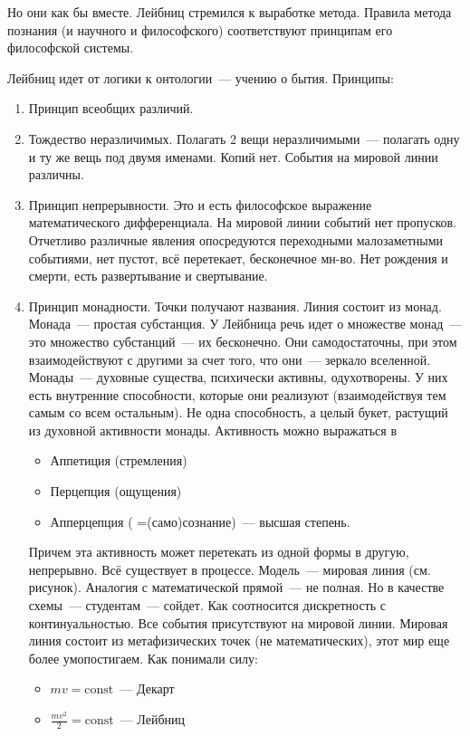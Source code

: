 Но они как бы вместе. Лейбниц стремился к выработке метода. Правила метода познания (и научного и философского) соответствуют принципам его философской системы.

Лейбниц идет от логики к онтологии~--- учению о бытия. Принципы:
\begin{enumerate}
	\item Принцип всеобщих различий. 
	\item Тождество неразличимых. Полагать 2 вещи неразличимыми~--- полагать одну и ту же вещь под двумя именами. Копий нет. События на мировой линии различны. 
	\item Принцип непрерывности. Это и есть философское выражение математического дифференциала. На мировой линии событий нет пропусков. Отчетливо различные явления опосредуются переходными малозаметными событиями, нет пустот, всё перетекает, бесконечное мн-во. Нет рождения и смерти, есть развертывание и свертывание. 
	\item Принцип монадности. Точки получают названия. Линия состоит из монад. Монада~--- простая субстанция. У Лейбница речь идет о множестве монад~--- это множество субстанций~--- их бесконечно. Они самодостаточны, при этом взаимодействуют с другими за счет того, что они~--- зеркало вселенной. Монады~--- духовные существа, психически активны, одухотворены. У них есть внутренние способности, которые они реализуют (взаимодействуя тем самым со всем остальным). Не одна способность, а целый букет, растущий из духовной активности монады. Активность можно выражаться в 
	\begin{itemize}
		\item Аппетиция (стремления)
		\item Перцепция (ощущения)
		\item Апперцепция ( =(само)сознание)~--- высшая степень.
	\end{itemize}
	Причем эта активность может перетекать из одной формы в другую, непрерывно. 
	Всё существует в процессе. 
	Модель~--- мировая линия (см. рисунок). Аналогия с математической прямой~--- не полная. Но в качестве схемы~--- студентам~--- сойдет. Как соотносится дискретность с континуальностью. Все события присутствуют на мировой линии. Мировая линия состоит из метафизических точек (не математических), этот мир еще более умопостигаем.
	Как понимали силу:
	\begin{itemize}
		\item $mv=\text{const}$~--- Декарт
		\item $\frac{mv^2}2=\text{const}$~--- Лейбниц
	\end{itemize}

\end{enumerate}
